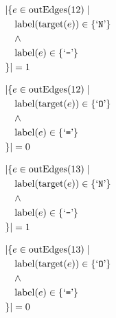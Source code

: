\begin{align*}
&|\{e \in \mathrm{outEdges}(12)  \mid \\
&\quad \mathrm{label}(\mathrm{target}(e)) \in \{ \text{`\texttt{N}'} \}\\
&\quad \wedge\\
&\quad \mathrm{label}(e) \in \{ \text{`\texttt{-}'} \}\\
&\}| = 1
\end{align*}

\begin{align*}
&|\{e \in \mathrm{outEdges}(12)  \mid \\
&\quad \mathrm{label}(\mathrm{target}(e)) \in \{ \text{`\texttt{O}'} \}\\
&\quad \wedge\\
&\quad \mathrm{label}(e) \in \{ \text{`\texttt{=}'} \}\\
&\}| = 0
\end{align*}

\begin{align*}
&|\{e \in \mathrm{outEdges}(13)  \mid \\
&\quad \mathrm{label}(\mathrm{target}(e)) \in \{ \text{`\texttt{N}'} \}\\
&\quad \wedge\\
&\quad \mathrm{label}(e) \in \{ \text{`\texttt{-}'} \}\\
&\}| = 1
\end{align*}

\begin{align*}
&|\{e \in \mathrm{outEdges}(13)  \mid \\
&\quad \mathrm{label}(\mathrm{target}(e)) \in \{ \text{`\texttt{O}'} \}\\
&\quad \wedge\\
&\quad \mathrm{label}(e) \in \{ \text{`\texttt{=}'} \}\\
&\}| = 0
\end{align*}

